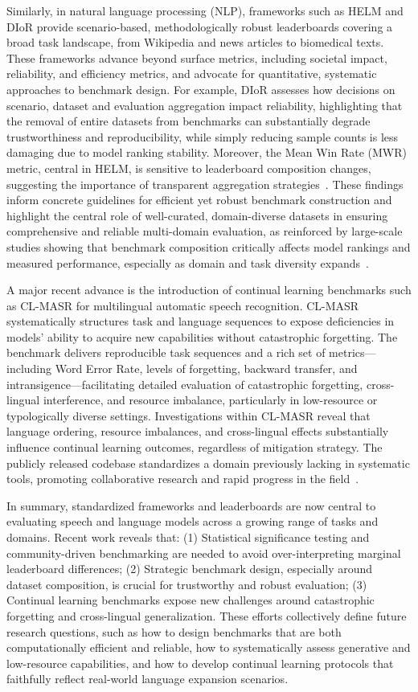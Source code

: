 \documentclass[sigconf]{acmart}
\begin{document}
Similarly, in natural language processing (NLP), frameworks such as HELM and DIoR provide scenario-based, methodologically robust leaderboards covering a broad task landscape, from Wikipedia and news articles to biomedical texts. These frameworks advance beyond surface metrics, including societal impact, reliability, and efficiency metrics, and advocate for quantitative, systematic approaches to benchmark design. For example, DIoR assesses how decisions on scenario, dataset and evaluation aggregation impact reliability, highlighting that the removal of entire datasets from benchmarks can substantially degrade trustworthiness and reproducibility, while simply reducing sample counts is less damaging due to model ranking stability. Moreover, the Mean Win Rate (MWR) metric, central in HELM, is sensitive to leaderboard composition changes, suggesting the importance of transparent aggregation strategies~\cite{ref104}. These findings inform concrete guidelines for efficient yet robust benchmark construction and highlight the central role of well-curated, domain-diverse datasets in ensuring comprehensive and reliable multi-domain evaluation, as reinforced by large-scale studies showing that benchmark composition critically affects model rankings and measured performance, especially as domain and task diversity expands~\cite{ref106}.

A major recent advance is the introduction of continual learning benchmarks such as CL-MASR for multilingual automatic speech recognition. CL-MASR systematically structures task and language sequences to expose deficiencies in models' ability to acquire new capabilities without catastrophic forgetting. The benchmark delivers reproducible task sequences and a rich set of metrics—including Word Error Rate, levels of forgetting, backward transfer, and intransigence—facilitating detailed evaluation of catastrophic forgetting, cross-lingual interference, and resource imbalance, particularly in low-resource or typologically diverse settings. Investigations within CL-MASR reveal that language ordering, resource imbalances, and cross-lingual effects substantially influence continual learning outcomes, regardless of mitigation strategy. The publicly released codebase standardizes a domain previously lacking in systematic tools, promoting collaborative research and rapid progress in the field~\cite{ref102}.

In summary, standardized frameworks and leaderboards are now central to evaluating speech and language models across a growing range of tasks and domains. Recent work reveals that: (1) Statistical significance testing and community-driven benchmarking are needed to avoid over-interpreting marginal leaderboard differences; (2) Strategic benchmark design, especially around dataset composition, is crucial for trustworthy and robust evaluation; (3) Continual learning benchmarks expose new challenges around catastrophic forgetting and cross-lingual generalization. These efforts collectively define future research questions, such as how to design benchmarks that are both computationally efficient and reliable, how to systematically assess generative and low-resource capabilities, and how to develop continual learning protocols that faithfully reflect real-world language expansion scenarios.
\end{document}
